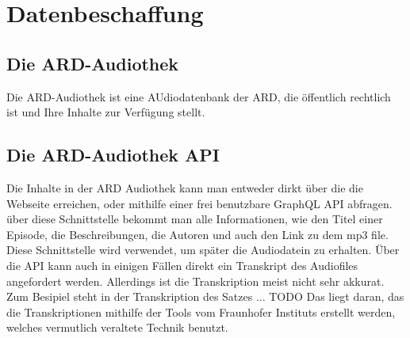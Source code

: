 \chapter{Datenbeschaffung}\label{ch:data}

\section{Die ARD-Audiothek}

Die ARD-Audiothek ist eine AUdiodatenbank der ARD, die öffentlich rechtlich ist und Ihre Inhalte zur Verfügung stellt.

\section{Die ARD-Audiothek API}

Die Inhalte in der ARD Audiothek kann man entweder dirkt über die die Webseite erreichen, oder mithilfe einer frei benutzbare  GraphQL API abfragen. über diese Schnittstelle bekommt man alle Informationen, wie den Titel einer Episode, die Beschreibungen, die Autoren und auch den Link zu dem mp3 file.
Diese Schnittstelle wird verwendet, um später die Audiodatein zu erhalten. 
Über die API kann auch in einigen Fällen direkt ein Transkript des Audiofiles angefordert werden. 
Allerdings ist die Transkription meist nicht sehr akkurat.
Zum Besipiel steht in der Transkription des Satzes ... TODO
Das liegt daran, das die Transkriptionen mithilfe der Tools vom Fraunhofer Instituts erstellt werden, welches vermutlich veraltete Technik benutzt.


